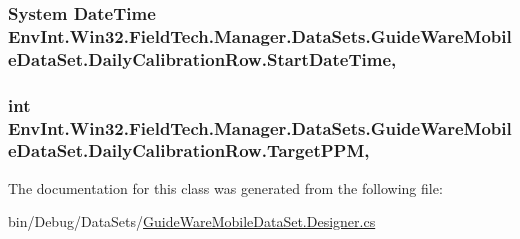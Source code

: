 \subsubsection[{Start\+Date\+Time}]{\setlength{\rightskip}{0pt plus 5cm}System Date\+Time Env\+Int.\+Win32.\+Field\+Tech.\+Manager.\+Data\+Sets.\+Guide\+Ware\+Mobile\+Data\+Set.\+Daily\+Calibration\+Row.\+Start\+Date\+Time\hspace{0.3cm}{\ttfamily [get]}, {\ttfamily [set]}}\label{class_env_int_1_1_win32_1_1_field_tech_1_1_manager_1_1_data_sets_1_1_guide_ware_mobile_data_set_1_1_daily_calibration_row_ad1fee5a6e35385f5a2e491e47a3b5a72}
\hypertarget{class_env_int_1_1_win32_1_1_field_tech_1_1_manager_1_1_data_sets_1_1_guide_ware_mobile_data_set_1_1_daily_calibration_row_a999e3dd144d1928571b0eb3fc42ee426}{}
\subsubsection[{Target\+P\+P\+M}]{\setlength{\rightskip}{0pt plus 5cm}int Env\+Int.\+Win32.\+Field\+Tech.\+Manager.\+Data\+Sets.\+Guide\+Ware\+Mobile\+Data\+Set.\+Daily\+Calibration\+Row.\+Target\+P\+P\+M\hspace{0.3cm}{\ttfamily [get]}, {\ttfamily [set]}}\label{class_env_int_1_1_win32_1_1_field_tech_1_1_manager_1_1_data_sets_1_1_guide_ware_mobile_data_set_1_1_daily_calibration_row_a999e3dd144d1928571b0eb3fc42ee426}


The documentation for this class was generated from the following file\+:\begin{DoxyCompactItemize}
\item 
bin/\+Debug/\+Data\+Sets/\hyperlink{bin_2_debug_2_data_sets_2_guide_ware_mobile_data_set_8_designer_8cs}{Guide\+Ware\+Mobile\+Data\+Set.\+Designer.\+cs}\end{DoxyCompactItemize}
